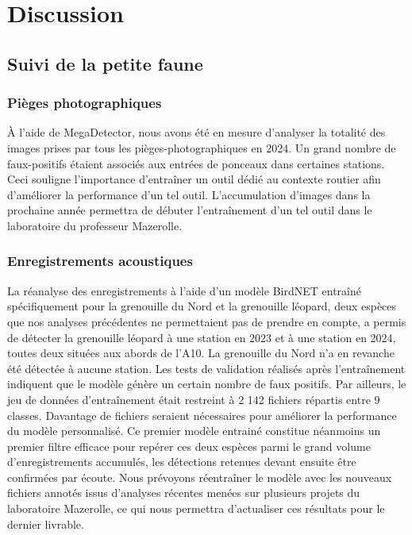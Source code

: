 \section{Discussion}

\subsection{Suivi de la petite faune}

\subsubsection{Pièges photographiques}

À l'aide de MegaDetector, nous avons été en mesure d'analyser la totalité des images prises par tous les pièges-photographiques en 2024. Un grand nombre de faux-positifs étaient associés aux entrées de ponceaux dans certaines stations. Ceci souligne l'importance d'entraîner un outil dédié au contexte routier afin d'améliorer la performance d'un tel outil. L'accumulation d'images dans la prochaine année permettra de débuter l'entraînement d'un tel outil dans le laboratoire du professeur Mazerolle.

\subsubsection{Enregistrements acoustiques}

La réanalyse des enregistrements à l'aide d'un modèle BirdNET entraîné spécifiquement pour la grenouille du Nord et la grenouille léopard, deux espèces que nos analyses précédentes ne permettaient pas de prendre en compte, a permis de détecter la grenouille léopard à une station en 2023 et à une station en 2024, toutes deux situées aux abords de l'A10. La grenouille du Nord n'a en revanche été détectée à aucune station. Les tests de validation réalisés après l'entraînement indiquent que le modèle génère un certain nombre de faux positifs. Par ailleurs, le jeu de données d'entraînement était restreint à 2 142 fichiers répartis entre 9 classes. Davantage de fichiers seraient nécessaires pour améliorer la performance du modèle personnalisé. Ce premier modèle entrainé constitue néanmoins un premier filtre efficace pour repérer ces deux espèces parmi le grand volume d'enregistrements accumulés, les détections retenues devant ensuite être confirmées par écoute. Nous prévoyons réentraîner le modèle avec les nouveaux fichiers annotés issus d'analyses récentes menées sur plusieurs projets du laboratoire Mazerolle, ce qui nous permettra d'actualiser ces résultats pour le dernier livrable.